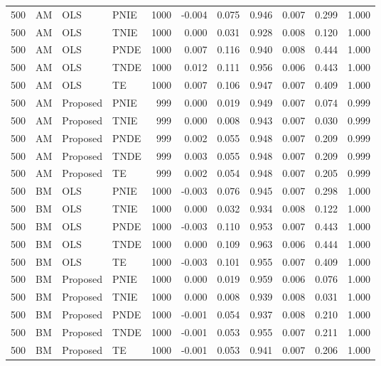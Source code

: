 \begin{longtable}{rlllrrrrrrr}
500 & AM & OLS & PNIE & 1000 & -0.004 & 0.075 & 0.946 & 0.007 & 0.299 & 1.000 \\
500 & AM & OLS & TNIE & 1000 & 0.000 & 0.031 & 0.928 & 0.008 & 0.120 & 1.000 \\
500 & AM & OLS & PNDE & 1000 & 0.007 & 0.116 & 0.940 & 0.008 & 0.444 & 1.000 \\
500 & AM & OLS & TNDE & 1000 & 0.012 & 0.111 & 0.956 & 0.006 & 0.443 & 1.000 \\
500 & AM & OLS & TE & 1000 & 0.007 & 0.106 & 0.947 & 0.007 & 0.409 & 1.000 \\
500 & AM & Proposed & PNIE & 999 & 0.000 & 0.019 & 0.949 & 0.007 & 0.074 & 0.999 \\
500 & AM & Proposed & TNIE & 999 & 0.000 & 0.008 & 0.943 & 0.007 & 0.030 & 0.999 \\
500 & AM & Proposed & PNDE & 999 & 0.002 & 0.055 & 0.948 & 0.007 & 0.209 & 0.999 \\
500 & AM & Proposed & TNDE & 999 & 0.003 & 0.055 & 0.948 & 0.007 & 0.209 & 0.999 \\
500 & AM & Proposed & TE & 999 & 0.002 & 0.054 & 0.948 & 0.007 & 0.205 & 0.999 \\
500 & BM & OLS & PNIE & 1000 & -0.003 & 0.076 & 0.945 & 0.007 & 0.298 & 1.000 \\
500 & BM & OLS & TNIE & 1000 & 0.000 & 0.032 & 0.934 & 0.008 & 0.122 & 1.000 \\
500 & BM & OLS & PNDE & 1000 & -0.003 & 0.110 & 0.953 & 0.007 & 0.443 & 1.000 \\
500 & BM & OLS & TNDE & 1000 & 0.000 & 0.109 & 0.963 & 0.006 & 0.444 & 1.000 \\
500 & BM & OLS & TE & 1000 & -0.003 & 0.101 & 0.955 & 0.007 & 0.409 & 1.000 \\
500 & BM & Proposed & PNIE & 1000 & 0.000 & 0.019 & 0.959 & 0.006 & 0.076 & 1.000 \\
500 & BM & Proposed & TNIE & 1000 & 0.000 & 0.008 & 0.939 & 0.008 & 0.031 & 1.000 \\
500 & BM & Proposed & PNDE & 1000 & -0.001 & 0.054 & 0.937 & 0.008 & 0.210 & 1.000 \\
500 & BM & Proposed & TNDE & 1000 & -0.001 & 0.053 & 0.955 & 0.007 & 0.211 & 1.000 \\
500 & BM & Proposed & TE & 1000 & -0.001 & 0.053 & 0.941 & 0.007 & 0.206 & 1.000 \\
\bottomrule
\end{longtable}
\endgroup
